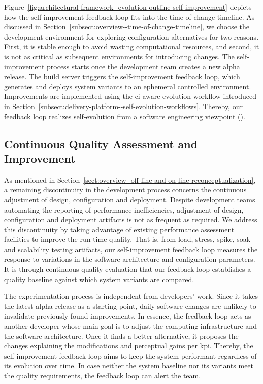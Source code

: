 Figure~\ref{fig:architectural-framework--evolution-outline-self-improvement} depicts how the self-improvement feedback loop fits into the time-of-change timeline. As discussed in Section~\ref{subsect:overview--time-of-change-timeline}, we choose the development environment for exploring configuration alternatives for two reasons. First, it is stable enough to avoid wasting computational resources, and second, it is not as critical as subsequent environments for introducing changes. The self-improvement process starts once the development team creates a new alpha release. The build server triggers the self-improvement feedback loop, which generates and deploys system variants to an ephemeral controlled environment. Improvements are implemented using the \gls{ci}-aware evolution workflow introduced in Section~\ref{subsect:delivery-platform--self-evolution-workflows}. Thereby, our feedback loop realizes self-evolution from a software engineering viewpoint ().

\subsection{Continuous Quality Assessment and Improvement}
\label{subsect:architectural-framework--continuous-quality-assessment}

As mentioned in Section~\ref{sect:overview--off-line-and-on-line-reconceptualization}, a remaining discontinuity in the development process concerns the continuous adjustment of design, configuration and deployment. Despite development teams automating the reporting of performance inefficiencies, adjustment of design, configuration and deployment artifacts is not as frequent as required. We address this discontinuity by taking advantage of existing performance assessment facilities to improve the run-time quality. That is, from load, stress, spike, soak and scalability testing artifacts, our self-improvement feedback loop measures the response to variations in the software architecture and configuration parameters. It is through continuous quality evaluation that our feedback loop establishes a quality baseline against which system variants are compared.

The experimentation process is independent from developers' work. Since it takes the latest alpha release as a starting point, daily software changes are unlikely to invalidate previously found improvements. In essence, the feedback loop acts as another developer whose main goal is to adjust the computing infrastructure and the software architecture. Once it finds a better alternative, it proposes the changes explaining the modifications and perceptual gains per \gls{kpi}. Thereby, the self-improvement feedback loop aims to keep the system performant regardless of its evolution over time. In case neither the system baseline nor its variants meet the quality requirements, the feedback loop can alert the team.

